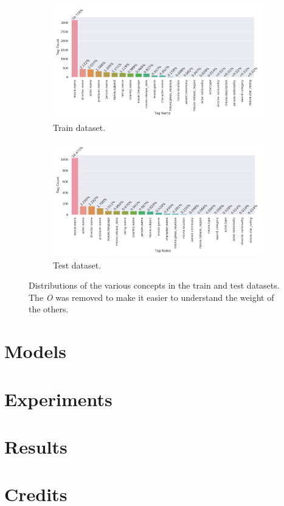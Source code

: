 \documentclass[11pt,a4paper]{article}
\begin{document}
\begin{figure}[t]
	\begin{subfigure}[b]{0.5\textwidth}
		\includegraphics[width=\textwidth]{img/train-concepts-distribution}
		\caption{Train dataset.}
	\end{subfigure}
	\hfill
	\begin{subfigure}[b]{0.5\textwidth}
	\includegraphics[width=\textwidth]{img/test-concepts-distribution}
	\caption{Test dataset.}
	\end{subfigure}
	\caption{Distributions of the various concepts in the train and test datasets. The \textit{O} was removed to make it easier to understand the weight of the others.}
\end{figure}


\section{Models}

\section{Experiments}

\section{Results}

\section{Credits}
\end{document}
